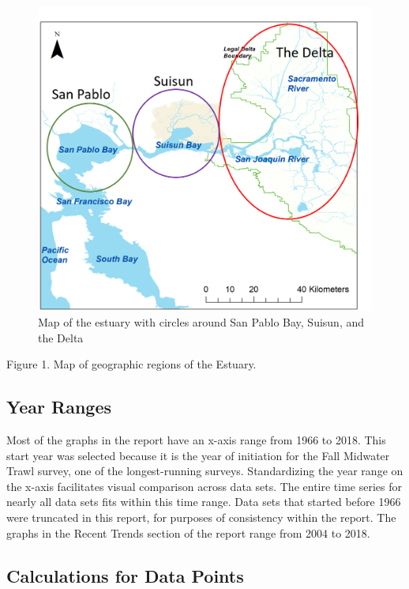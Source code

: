 \documentclass[
]{book}
\begin{document}
\begin{figure}
\includegraphics[width=15.62in]{figures/map} \caption{Map of the estuary with circles around San Pablo Bay, Suisun, and the Delta}\label{fig:unnamed-chunk-186}
\end{figure}

Figure 1. Map of geographic regions of the Estuary.

\hypertarget{year-ranges}{%
\subsection{Year Ranges}\label{year-ranges}}

Most of the graphs in the report have an x-axis range from 1966 to 2018. This start year was selected because it is the year of initiation for the Fall Midwater Trawl survey, one of the longest-running surveys. Standardizing the year range on the x-axis facilitates visual comparison across data sets. The entire time series for nearly all data sets fits within this time range. Data sets that started before 1966 were truncated in this report, for purposes of consistency within the report. The graphs in the Recent Trends section of the report range from 2004 to 2018.

\hypertarget{calculations-for-data-points}{%
\subsection{Calculations for Data Points}\label{calculations-for-data-points}}
\end{document}
